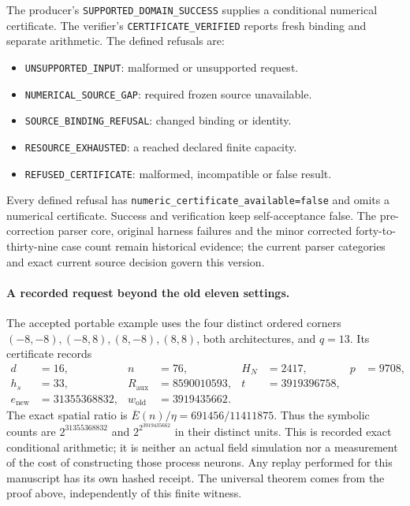 \documentclass[11pt]{article}
\theoremstyle{plain}
\theoremstyle{definition}
\theoremstyle{remark}
\begin{document}
The producer's \texttt{SUPPORTED\_DOMAIN\_SUCCESS} supplies a conditional
numerical certificate. The verifier's \texttt{CERTIFICATE\_VERIFIED}
reports fresh binding and separate arithmetic. The defined refusals are:
\begin{itemize}[nosep]
\item \texttt{UNSUPPORTED\_INPUT}: malformed or unsupported request.
\item \texttt{NUMERICAL\_SOURCE\_GAP}: required frozen source unavailable.
\item \texttt{SOURCE\_BINDING\_REFUSAL}: changed binding or identity.
\item \texttt{RESOURCE\_EXHAUSTED}: a reached declared finite capacity.
\item \texttt{REFUSED\_CERTIFICATE}: malformed, incompatible or false result.
\end{itemize}
Every defined refusal has
\texttt{numeric\_certificate\_available=false} and omits a numerical
certificate. Success and verification keep self-acceptance false. The
pre-correction parser core, original harness failures and the minor corrected
forty-to-thirty-nine case count remain historical evidence; the current
parser categories and exact current source decision govern this version.

\paragraph{A recorded request beyond the old eleven settings.}
The accepted portable example uses the four distinct ordered corners
$(-8,-8),(-8,8),(8,-8),(8,8)$, both architectures, and $q=13$.
Its certificate records
\begin{align*}
 d&=16,&n&=76,&H_N&=2417,&p&=9708,\\
 h_s&=33,&R_{\mathrm{aux}}&=8590010593,&t&=3919396758,\\
 e_{\mathrm{new}}&=31355368832,&w_{\mathrm{old}}&=3919435662.
\end{align*}
The exact spatial ratio is $\overline E(n)/\eta=691456/11411875$.
Thus the symbolic counts are $2^{31355368832}$ and
$2^{2^{3919435662}}$ in their distinct units. This is recorded exact
conditional arithmetic; it is neither an actual field simulation nor a
measurement of the cost of constructing those process neurons. Any replay
performed for this manuscript has its own hashed receipt. The universal
theorem comes from the proof above, independently of this finite witness.
\end{document}
